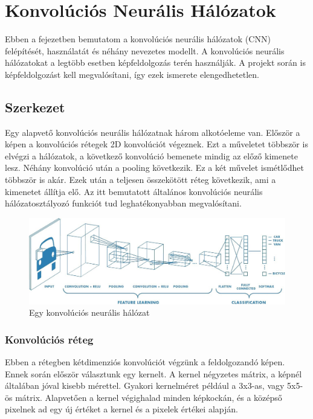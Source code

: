 \newcommand{\cnn}{konvolúciós neurális hálózat}

\chapter{Konvolúciós Neurális Hálózatok}
Ebben a fejezetben bemutatom a \cnn ok (CNN) felépítését, használatát és néhány nevezetes modellt. A \cnn okat a legtöbb esetben képfeldolgozás terén használják. A projekt során is képfeldolgozást kell megvalósítani, így ezek ismerete elengedhetetlen.

\section{Szerkezet}
Egy alapvető \cnn nak három alkotóeleme van. Először a képen a konvolúciós rétegek 2D konvolúciót végeznek. Ezt a műveletet többször is elvégzi a hálózatok, a következő konvolúció bemenete mindig az előző kimenete lesz. Néhány konvolúció után a pooling következik. Ez a két művelet ismétlődhet többször is akár. Ezek után a teljesen összekötött réteg következik, ami a kimenetet állítja elő. Az itt bemutatott általános \cnn osztályozó funkciót tud leghatékonyabban megvalósítani.

\begin{figure}[!ht]
    \centering
    \includegraphics[width=150mm, keepaspectratio]{figures/cnn.jpeg}
    \caption{Egy konvolúciós neurális hálózat \cite{nnpic}}
\end{figure}

\subsection{Konvolúciós réteg}
Ebben a rétegben kétdimenziós konvolúciót végzünk a feldolgozandó képen. Ennek során először választunk egy kernelt. A kernel négyzetes mátrix, a képnél általában jóval kisebb mérettel. Gyakori kernelméret például a 3x3-as, vagy 5x5-ös mátrix. Alapvetően a kernel végighalad minden képkockán, és a középső pixelnek ad egy új értéket a kernel és a pixelek értékei alapján.

